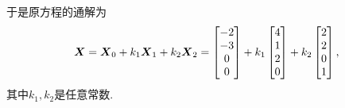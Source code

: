\begin{example}
\begin{solution}
于是原方程的通解为\[
\boldsymbol{X} = \boldsymbol{X}_0 + k_1 \boldsymbol{X}_1 + k_2 \boldsymbol{X}_2
= \begin{bmatrix} -2 \\ -3 \\ 0 \\ 0 \end{bmatrix}
+ k_1 \begin{bmatrix} 4 \\ 1 \\ 2 \\ 0 \end{bmatrix}
+ k_2 \begin{bmatrix} 2 \\ 2 \\ 0 \\ 1 \end{bmatrix},
\]其中\(k_1,k_2\)是任意常数.
\end{solution}
\end{example}

